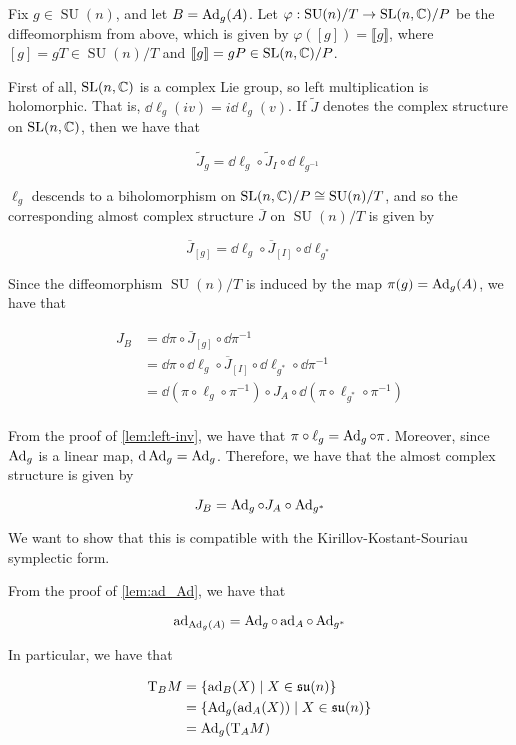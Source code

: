 \documentclass{article}
\DeclareMathOperator{\SU}{SU}
\newcommand{\su}{\mathfrak{su}}
\renewcommand{\tilde}{\widetilde}
\begin{document}
Fix \(g \in \SU(n)\), and let \(B = \operatorname{Ad}_g(A)\). Let \(\varphi : \SU(n)/T \to \SL(n, \C)/P\) be the diffeomorphism from above, which is given by \(\varphi([g]) = \llbracket g\rrbracket\), where \([g] = gT \in \SU(n)/T\) and \(\llbracket g \rrbracket = gP \in \operatorname{SL}(n, \mathbb{C})/P\).

First of all, \(\operatorname{SL}(n, \mathbb{C})\) is a complex Lie group, so left multiplication is holomorphic. That is, \(\dd \ell_g(iv) = i\dd\ell_g(v)\). If \(\tilde J\) denotes the complex structure on \(\operatorname{SL}(n, \mathbb{C})\), then we have that

\[\tilde J_g = \dd \ell_g \circ \tilde J_I \circ \dd\ell_{g^{-1}}\]

\(\ell_g\) descends to a biholomorphism on \(\SL(n, \C)/P \cong \SU(n)/T\), and so the corresponding almost complex structure \(\overline J\) on \(\SU(n)/T\) is given by

\begin{equation}
    \label{eq:cx-str-quot}
    \overline J_{[g]} = \dd\ell_g \circ \overline J_{[I]} \circ \dd\ell_{g^*}
\end{equation}

Since the diffeomorphism \(\SU(n)/T\) is induced by the map \(\pi(g) = \operatorname{Ad}_g(A)\), we have that

\begin{align*}
    J_B &= \dd\pi \circ \overline J_{[g]} \circ \dd\pi^{-1} \\
    &= \dd\pi \circ \dd \ell_g \circ \overline J_{[I]} \circ \dd \ell_{g^*} \circ \dd \pi^{-1} \\
    &= \dd(\pi \circ \ell_g \circ \pi^{-1}) \circ J_A \circ \dd(\pi \circ \ell_{g^*} \circ \pi^{-1}) \\
\end{align*}

From the proof of \cref{lem:left-inv}, we have that \(\pi \circ \ell_g = \operatorname{Ad}_g \circ \pi\). Moreover, since \(\operatorname{Ad}_g\) is a linear map, \(\dd \operatorname{Ad}_g = \operatorname{Ad}_g\). Therefore, we have that the almost complex structure is given by

\[J_B = \operatorname{Ad}_g \circ J_A \circ \operatorname{Ad}_{g^*}\]

We want to show that this is compatible with the Kirillov-Kostant-Souriau symplectic form.

From the proof of \cref{lem:ad_Ad}, we have that

\[\operatorname{ad}_{\operatorname{Ad}_g(A)} = \operatorname{Ad}_g \circ \operatorname{ad}_A \circ \operatorname{Ad}_{g^*}\]

In particular, we have that

\begin{align*}
    \TT_B M &= \left\{\ad_B(X) \mid X \in \su(n)\right\} \\
    &= \left\{\Ad_g(\ad_A(X)) \mid X \in \su(n)\right\} \\
    &= \Ad_g(\TT_A M) 
\end{align*}
\end{document}
